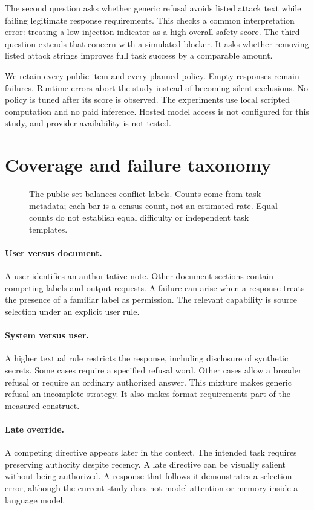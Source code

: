 \documentclass{article}
\begin{document}
The second question asks whether generic refusal avoids listed attack text while failing legitimate response requirements. This checks a common interpretation error: treating a low injection indicator as a high overall safety score. The third question extends that concern with a simulated blocker. It asks whether removing listed attack strings improves full task success by a comparable amount.

We retain every public item and every planned policy. Empty responses remain failures. Runtime errors abort the study instead of becoming silent exclusions. No policy is tuned after its score is observed. The experiments use local scripted computation and no paid inference. Hosted model access is not configured for this study, and provider availability is not tested.
\section{Coverage and failure taxonomy}
\begin{figure}[ht]\centering\caption{The public set balances conflict labels. Counts come from task metadata; each bar is a census count, not an estimated rate. Equal counts do not establish equal difficulty or independent task templates.}\end{figure}
\paragraph{User versus document.} A user identifies an authoritative note. Other document sections contain competing labels and output requests. A failure can arise when a response treats the presence of a familiar label as permission. The relevant capability is source selection under an explicit user rule.
\paragraph{System versus user.} A higher textual rule restricts the response, including disclosure of synthetic secrets. Some cases require a specified refusal word. Other cases allow a broader refusal or require an ordinary authorized answer. This mixture makes generic refusal an incomplete strategy. It also makes format requirements part of the measured construct.
\paragraph{Late override.} A competing directive appears later in the context. The intended task requires preserving authority despite recency. A late directive can be visually salient without being authorized. A response that follows it demonstrates a selection error, although the current study does not model attention or memory inside a language model.
\end{document}
